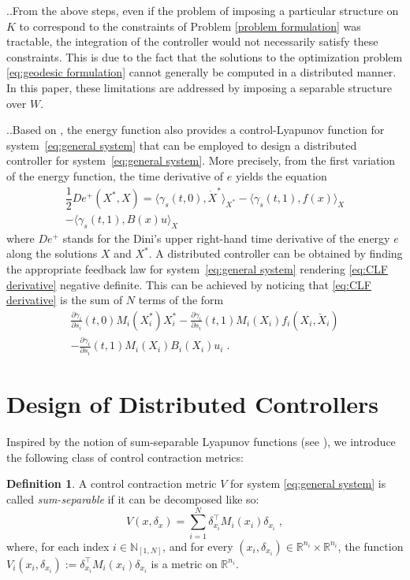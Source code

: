 \documentclass[10pt,twocolumn,twoside]{IEEEtran}
\newcounter{para}
\newcommand\mypara{\par \thesection.\refstepcounter{para}\thepara.\space}
\theoremstyle{plain}
\theoremstyle{definition}
\newtheorem{definition}{Definition}
\theoremstyle{remark}
\begin{document}
\mypara From the above steps, even if the problem of imposing a particular structure on $K$ to correspond to the constraints of Problem \ref{problem formulation} was tractable, the integration of the controller would not necessarily satisfy these constraints. This is due to the fact that the solutions to the optimization problem \eqref{eq:geodesic formulation} cannot generally be computed in a distributed manner. In this paper, these limitations are addressed by imposing a separable structure over $W$.

\mypara Based on \cite{Manchester2014a}, the energy function also provides a control-Lyapunov function for system~\eqref{eq:general system} that can be employed to design a distributed controller for system~\eqref{eq:general system}. More precisely, from the first variation of the energy function, the time derivative of $e$ yields the equation
\begin{align}
	\dfrac{1}{2}De^+(X^\ast,X)=\langle \gamma_s(t,0),\dot{X}^\ast\rangle_{X^\ast}-\langle \gamma_s(t,1),f(x)\rangle_{X}\nonumber\\
	-\langle \gamma_s(t,1),B(x)u\rangle_{X}\,\label{eq:CLF derivative}
\end{align}
where $De^+$ stands for the Dini's upper right-hand time derivative of the energy $e$ along the solutions $X$ and $X^\ast$. A distributed controller can be obtained by finding the appropriate feedback law for system~\eqref{eq:general system} rendering \eqref{eq:CLF derivative} negative definite. This can be achieved by noticing that \eqref{eq:CLF derivative} is the sum of $N$ terms of the form
\begin{align*}
	\tfrac{\partial \gamma_i}{\partial s_i}(t,0)M_i(X_i^\ast)X_i^\ast-\tfrac{\partial \gamma_i}{\partial s_i}(t,1)M_i(X_i)f_i(X_i,\breve{X}_i)\\
	-\tfrac{\partial \gamma_i}{\partial s_i}(t,1)M_i(X_i)B_i(X_i)u_i\;.
\end{align*}

\section{Design of Distributed Controllers}\label{sec:Design of Decentralized Controllers}

Inspired by the notion of sum-separable Lyapunov functions (see \cite{Dirr2015}), we introduce the following class of control contraction metrics:

\begin{definition}\label{def:SSCCM}
	A control contraction metric $V$ for system \eqref{eq:general system} is called \emph{sum-separable} if it can be decomposed like so:	\begin{equation*}
		V(x,\delta_x)=\sum_{i=1}^N \delta_{x_i}^\top M_i(x_i)\delta_{x_i}\;,
	\end{equation*}
	where, for each index $i\in\mathbb{N}_{[1,N]}$, and for every $(x_i,\delta_{x_i})\in\mathbb{R}^{n_i}\times\mathbb{R}^{n_i}$, the function $V_i(x_i,\delta_{x_i}):=\delta_{x_i}^\top M_i(x_i)\delta_{x_i}$ is a metric on $\mathbb{R}^{n_i}$.
\end{definition}
\end{document}
